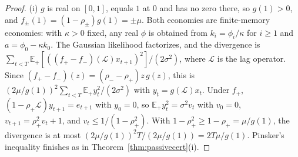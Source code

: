 \begin{proof}
(i) $g$ is real on $[0,1]$, equals $1$ at $0$ and has no zero there, so $g(1)>0$, and $f_\pm(1)=(1-\rho_\pm)g(1)=\pm\mu$. Both economies are finite-memory economies: with $\kappa>0$ fixed, any real $\phi$ is obtained from $k_i=\phi_i/\kappa$ for $i\ge1$ and $a=\phi_0-\kappa k_0$. The Gaussian likelihood factorizes, and the divergence is $\sum_{t<T}\mathbb E_+[((f_+-f_-)(\mathcal L)x_{t+1})^2]/(2\sigma^2)$, where $\mathcal L$ is the lag operator. Since $(f_+-f_-)(z)=(\rho_--\rho_+)z\,g(z)$, this is $(2\mu/g(1))^2\sum_{t<T}\mathbb E_+y_t^2/(2\sigma^2)$ with $y_t=g(\mathcal L)x_t$. Under $f_+$, $(1-\rho_+\mathcal L)y_{t+1}=e_{t+1}$ with $y_0=0$, so $\mathbb E_+y_t^2=\sigma^2v_t$ with $v_0=0$, $v_{t+1}=\rho_+^2v_t+1$, and $v_t\le1/(1-\rho_+^2)$. With $1-\rho_+^2\ge1-\rho_+=\mu/g(1)$, the divergence is at most $(2\mu/g(1))^2T/(2\mu/g(1))=2T\mu/g(1)$. Pinsker's inequality finishes as in Theorem~\ref{thm:passivecert}(i).


\end{proof}
